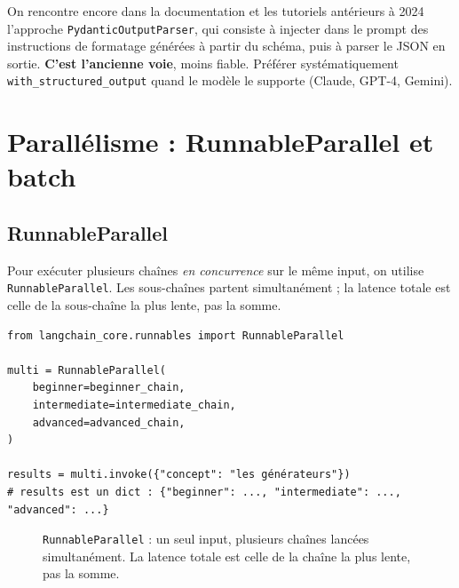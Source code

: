 \documentclass[11pt,a4paper]{article}
\begin{document}
On rencontre encore dans la documentation et les tutoriels antérieurs à 2024 l'approche \texttt{PydanticOutputParser}, qui consiste à injecter dans le prompt des instructions de formatage générées à partir du schéma, puis à parser le JSON en sortie. \textbf{C'est l'ancienne voie}, moins fiable. Préférer systématiquement \texttt{with\_structured\_output} quand le modèle le supporte (Claude, GPT-4, Gemini).

\section{Parallélisme : RunnableParallel et batch}

\subsection{RunnableParallel}

Pour exécuter plusieurs chaînes \emph{en concurrence} sur le même input, on utilise \texttt{RunnableParallel}. Les sous-chaînes partent simultanément ; la latence totale est celle de la sous-chaîne la plus lente, pas la somme.

\begin{verbatim}
from langchain_core.runnables import RunnableParallel

multi = RunnableParallel(
    beginner=beginner_chain,
    intermediate=intermediate_chain,
    advanced=advanced_chain,
)

results = multi.invoke({"concept": "les générateurs"})
# results est un dict : {"beginner": ..., "intermediate": ..., "advanced": ...}
\end{verbatim}

\begin{figure}[h]
\centering
{}
\caption{\texttt{RunnableParallel} : un seul input, plusieurs chaînes lancées simultanément. La latence totale est celle de la chaîne la plus lente, pas la somme.}
\end{figure}
\end{document}
